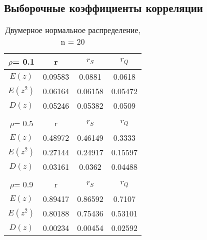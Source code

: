 \documentclass[12pt,a4paper]{scrartcl}
\begin{document}
\subsection{Выборочные коэффициенты корреляции}

\begin{table}[H]
    \centering
    \begin{tabular}{| c | c | c | c |}
\hline
 $\rho$= 0.1 & r       & $r_S$   & $r_Q$   \\ \hline
 $E(z)$      & 0.09583 & 0.0881  & 0.0618  \\ \hline
 $E(z^2)$    & 0.06164 & 0.06158 & 0.05472 \\ \hline
 $D(z)$      & 0.05246 & 0.05382 & 0.0509  \\ \hline
&  & & \\  \hline
 $\rho$= 0.5 & r       & $r_S$   & $r_Q$   \\ \hline
 $E(z)$      & 0.48972 & 0.46149 & 0.3333  \\ \hline
 $E(z^2)$    & 0.27144 & 0.24917 & 0.15597 \\ \hline
 $D(z)$      & 0.03161 & 0.0362  & 0.04488 \\ \hline
&  & & \\  \hline
 $\rho$= 0.9 & r       & $r_S$   & $r_Q$   \\ \hline
 $E(z)$      & 0.89417 & 0.86592 & 0.7107  \\ \hline
 $E(z^2)$    & 0.80188 & 0.75436 & 0.53101 \\ \hline
 $D(z)$      & 0.00234 & 0.00454 & 0.02592 \\
\hline
\end{tabular}
 \caption{Двумерное нормальное распределение, n = 20}
\label{tab:norm_20}
\end{table}
\end{document}

